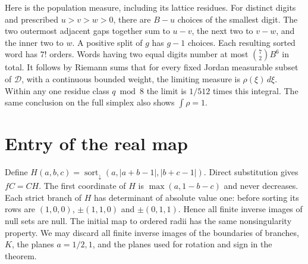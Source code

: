 \documentclass[11pt,reqno]{amsart}
\newcommand{\D}{\mathcal D}
\newcommand{\ord}{\operatorname{sort}_{\downarrow}}
\begin{document}
Here is the population measure, including its lattice residues. For distinct
digits and prescribed $u>v>w>0$, there are $B-u$ choices of the smallest
digit. The two outermost adjacent gaps together sum to $u-v$, the next
two to $v-w$, and the inner two to $w$. A positive split of $g$ has $g-1$
choices. Each resulting sorted word has $7!$ orders. Words having two equal
digits number at most $\binom72 B^6$ in total. It follows by Riemann sums
that for every fixed Jordan measurable subset of $\D$, with a continuous
bounded weight, the limiting measure is $\rho(\xi)\,d\xi$. Within any one
residue class $q\bmod 8$ the limit is $1/512$ times this integral. The
same conclusion on the full simplex also shows $\int\rho=1$.

\section{Entry of the real map}
Define $H(a,b,c)=\ord(a,|a+b-1|,|b+c-1|)$. Direct substitution gives
$fC=CH$. The first coordinate of $H$ is $\max(a,1-b-c)$ and never
decreases. Each strict branch of $H$ has determinant of absolute value one:
before sorting its rows are $(1,0,0)$, $\pm(1,1,0)$ and $\pm(0,1,1)$.
Hence all finite inverse images of null sets are null. The initial map to
ordered radii has the same nonsingularity property. We may discard all
finite inverse images of the boundaries of branches, $K$, the planes
$a=1/2,1$, and the planes used for rotation and sign in the theorem.
\end{document}
